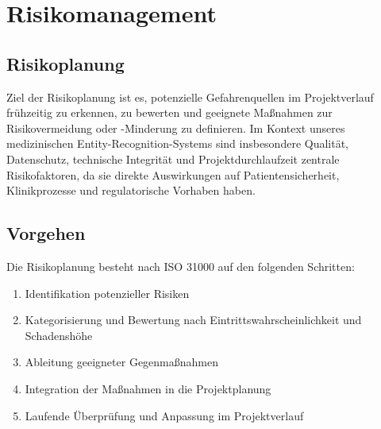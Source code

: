 \chapter{Risikomanagement}
\label{sec:risikomanagement}

\section{ Risikoplanung}
Ziel der Risikoplanung ist es, potenzielle Gefahrenquellen im Projektverlauf frühzeitig zu erkennen, zu bewerten und geeignete Maßnahmen zur Risikovermeidung oder -Minderung zu definieren. Im Kontext unseres medizinischen Entity-Recognition-Systems sind insbesondere Qualität, Datenschutz, technische Integrität und Projektdurchlaufzeit zentrale Risikofaktoren, da sie direkte Auswirkungen auf Patientensicherheit, Klinikprozesse und regulatorische Vorhaben haben.
\section{Vorgehen}
Die Risikoplanung besteht nach ISO 31000 auf den folgenden Schritten:
\begin{enumerate}
	\item Identifikation potenzieller Risiken
	\item Kategorisierung und Bewertung nach Eintrittswahrscheinlichkeit und Schadenshöhe
	\item Ableitung geeigneter Gegenmaßnahmen
	\item Integration der Maßnahmen in die Projektplanung
	\item Laufende Überprüfung und Anpassung im Projektverlauf
\end{enumerate}
